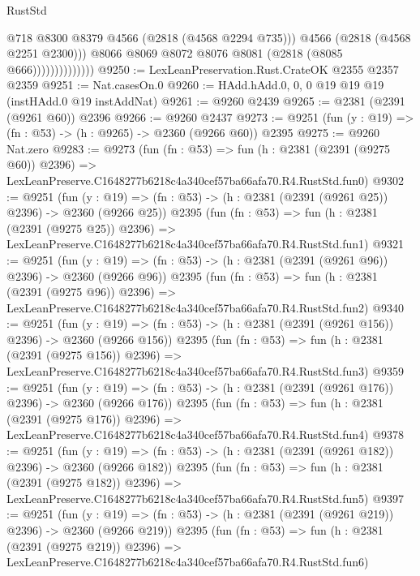 \begin{lexlean}{RustStd}
\begin{coremodule}
                                @718
                                @8300
                                @8379
                                @4566
                                (@2818 (@4568 @2294 @735)))
                              @4566
                              (@2818 (@4568 @2251 @2300)))
                            @8066
                            @8069
                            @8072
                            @8076
                            @8081
                            (@2818 (@8085 @666))))))))))))))
@9250 := LexLeanPreservation.Rust.CrateOK @2355 @2357 @2359
@9251 := Nat.casesOn.{0}
@9260 := HAdd.hAdd.{0, 0, 0} @19 @19 @19 (instHAdd.{0} @19 instAddNat)
@9261 := @9260 @2439
@9265 := @2381 (@2391 (@9261 @60)) @2396
@9266 := @9260 @2437
@9273 := @9251 (fun (y : @19) => (fn : @53) -> (h : @9265) -> @2360 (@9266 @60)) @2395
@9275 := @9260 Nat.zero
@9283 := @9273
    (fun (fn : @53) =>
    fun (h : @2381 (@2391 (@9275 @60)) @2396) =>
    LexLeanPreserve.C1648277b6218c4a340cef57ba66afa70.R4.RustStd.fun0)
@9302 := @9251
    (fun (y : @19) => (fn : @53) -> (h : @2381 (@2391 (@9261 @25)) @2396) -> @2360 (@9266 @25))
    @2395
    (fun (fn : @53) =>
    fun (h : @2381 (@2391 (@9275 @25)) @2396) =>
    LexLeanPreserve.C1648277b6218c4a340cef57ba66afa70.R4.RustStd.fun1)
@9321 := @9251
    (fun (y : @19) => (fn : @53) -> (h : @2381 (@2391 (@9261 @96)) @2396) -> @2360 (@9266 @96))
    @2395
    (fun (fn : @53) =>
    fun (h : @2381 (@2391 (@9275 @96)) @2396) =>
    LexLeanPreserve.C1648277b6218c4a340cef57ba66afa70.R4.RustStd.fun2)
@9340 := @9251
    (fun (y : @19) => (fn : @53) -> (h : @2381 (@2391 (@9261 @156)) @2396) -> @2360 (@9266 @156))
    @2395
    (fun (fn : @53) =>
    fun (h : @2381 (@2391 (@9275 @156)) @2396) =>
    LexLeanPreserve.C1648277b6218c4a340cef57ba66afa70.R4.RustStd.fun3)
@9359 := @9251
    (fun (y : @19) => (fn : @53) -> (h : @2381 (@2391 (@9261 @176)) @2396) -> @2360 (@9266 @176))
    @2395
    (fun (fn : @53) =>
    fun (h : @2381 (@2391 (@9275 @176)) @2396) =>
    LexLeanPreserve.C1648277b6218c4a340cef57ba66afa70.R4.RustStd.fun4)
@9378 := @9251
    (fun (y : @19) => (fn : @53) -> (h : @2381 (@2391 (@9261 @182)) @2396) -> @2360 (@9266 @182))
    @2395
    (fun (fn : @53) =>
    fun (h : @2381 (@2391 (@9275 @182)) @2396) =>
    LexLeanPreserve.C1648277b6218c4a340cef57ba66afa70.R4.RustStd.fun5)
@9397 := @9251
    (fun (y : @19) => (fn : @53) -> (h : @2381 (@2391 (@9261 @219)) @2396) -> @2360 (@9266 @219))
    @2395
    (fun (fn : @53) =>
    fun (h : @2381 (@2391 (@9275 @219)) @2396) =>
    LexLeanPreserve.C1648277b6218c4a340cef57ba66afa70.R4.RustStd.fun6)

\end{coremodule}
\end{lexlean}
